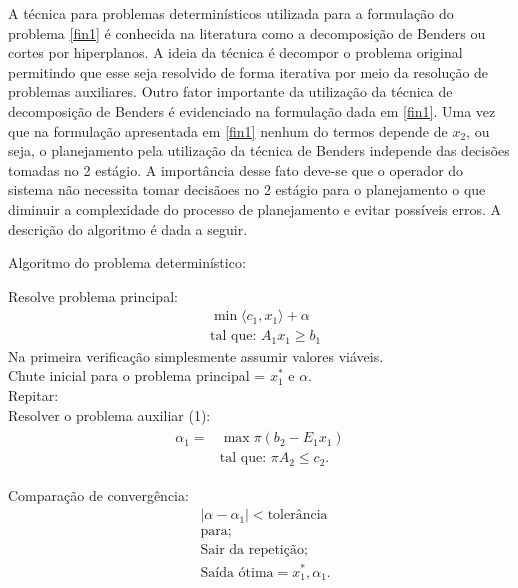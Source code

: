 A t\'ecnica para problemas determin\'isticos utilizada para a formula\c c\~ao do problema \ref{fin1} \'e conhecida na literatura como
a decomposi\c c\~ao de Benders \cite{benders} ou cortes por hiperplanos. A ideia da t\'ecnica \'e decompor o problema original permitindo que esse
seja resolvido de forma iterativa por meio da resolu\c c\~ao de problemas auxiliares. Outro fator importante da
utiliza\c c\~ao da t\'ecnica de decomposi\c c\~ao de Benders \'e evidenciado na formula\c c\~ao dada em \ref{fin1}. Uma
vez que na formula\c c\~ao apresentada em \ref{fin1} nenhum do termos depende de $x_2$, ou seja, o planejamento pela
utiliza\c c\~ao da t\'ecnica de Benders independe das decis\~oes tomadas no 2 est\'agio. A import\^ancia desse fato
deve-se que o operador do sistema n\~ao necessita tomar decis\~aoes no 2 est\'agio para o planejamento o que diminuir a
complexidade do processo de planejamento e evitar poss\'iveis erros.
A descri\c c\~ao do algoritmo \'e
dada a seguir.

\begin{center}
Algoritmo do problema determin\'istico:\\
\end{center}
Resolve problema principal:
\begin{align*}
&\min \langle c_1,x_1\rangle + \alpha \nonumber\\
&\mbox{tal que: }	A_1 x_1 \geq b_1
\end{align*}
Na primeira verifica\c c\~ao simplesmente assumir valores vi\'aveis.\\
Chute inicial para o problema principal = $x_1^{*}$ e $\alpha$.\\
Repitar:\\
Resolver  o problema auxiliar (1):
\begin{align*}
  \begin{split}	
 \alpha_1 = &\max \pi (b_2 - E_1x_1 ) \\
	&\mbox{tal que: }\pi A_2  \leq c_2.
  \end{split}
\end{align*}

	Compara\c c\~ao de converg\^encia:
		\begin{align*}
			&|\alpha - \alpha_1|< \mbox{toler\^ancia}\\
			&\mbox{para;}\\
			&\mbox{Sair da repeti\c c\~ao;}\\
			&\mbox{Sa\'ida \'otima} = x_1^{*}, \alpha_1.
		\end{align*}

